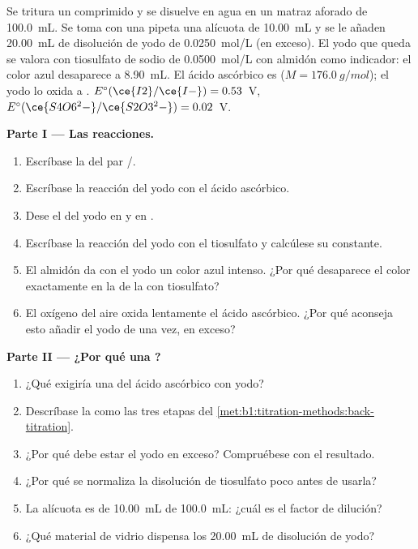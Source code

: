 \begin{problem}
\label{pb:b1:titration-methods:1}
Se tritura un comprimido y se disuelve en agua en un matraz aforado de
\qty{100.0}{mL}. Se toma con una pipeta una alícuota de \qty{10.00}{mL} y
se le añaden \qty{20.00}{mL} de disolución de yodo de \qty{0.0250}{mol/L}
(en exceso). El yodo que queda se valora con tiosulfato de sodio de
\qty{0.0500}{mol/L} con almidón como indicador: el color azul desaparece
a \qty{8.90}{mL}. El ácido ascórbico es 
($M = \qty{176.0}{g/mol}$); el yodo lo oxida a .
$E^\circ(\ce{I2}/\ce{I-}) = 0.53$~V,
$E^\circ(\ce{S4O6^2-}/\ce{S2O3^2-}) = 0.02$~V.

\medskip
\noindent\textbf{Parte I --- Las reacciones.}
\begin{enumerate}
  \item Escríbase la  del par /.
  \item Escríbase la reacción del yodo con el ácido ascórbico.
  \item Dese el  del yodo en  y en .
  \item Escríbase la reacción del yodo con el tiosulfato y calcúlese su
        constante.
  \item El almidón da con el yodo un color azul intenso. ¿Por qué
        desaparece el color exactamente en la  de la
         con tiosulfato?
  \item El oxígeno del aire oxida lentamente el ácido ascórbico. ¿Por qué
        aconseja esto añadir el yodo de una vez, en exceso?
\end{enumerate}

\medskip
\noindent\textbf{Parte II --- ¿Por qué una ?}
\begin{enumerate}[resume]
  \item ¿Qué exigiría una  del ácido ascórbico con
        yodo?
  \item Descríbase la  como las tres etapas del
        \cref{met:b1:titration-methods:back-titration}.
  \item ¿Por qué debe estar el yodo en exceso? Compruébese con el
        resultado.
  \item ¿Por qué se normaliza la disolución de tiosulfato poco antes de
        usarla?
  \item La alícuota es de \qty{10.00}{mL} de \qty{100.0}{mL}: ¿cuál es el
        factor de dilución?
  \item ¿Qué material de vidrio dispensa los \qty{20.00}{mL} de disolución
        de yodo?
\end{enumerate}


\end{problem}
